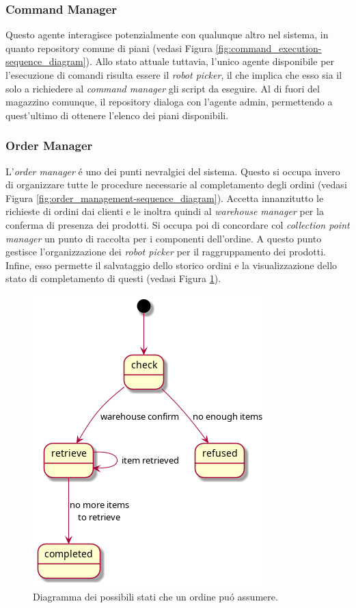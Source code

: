 \subsubsection{Command Manager}
Questo agente interagisce potenzialmente con qualunque altro nel sistema, in quanto repository comune di piani (vedasi Figura \ref{fig:command_execution-sequence_diagram}). Allo stato attuale tuttavia, l'unico agente disponibile per l'esecuzione di comandi risulta essere il \textit{robot picker}, il che implica che esso sia il solo a richiedere al \textit{command manager} gli script da eseguire. Al di fuori del magazzino comunque, il repository dialoga con l'agente admin, permettendo a quest'ultimo di ottenere l'elenco dei piani disponibili.

\subsubsection{Order Manager}
L'\textit{order manager} \'e uno dei punti nevralgici del sistema. Questo si occupa invero di organizzare tutte le procedure necessarie al completamento degli ordini (vedasi Figura \ref{fig:order_management-sequence_diagram}). Accetta innanzitutto le richieste di ordini dai clienti e le inoltra quindi al \textit{warehouse manager} per la conferma di presenza dei prodotti. Si occupa poi di concordare col \textit{collection point manager} un punto di raccolta per i componenti dell'ordine. A questo punto gestisce l'organizzazione dei \textit{robot picker} per il raggruppamento dei prodotti. Infine, esso permette il salvataggio dello storico ordini e la visualizzazione dello stato di completamento di questi (vedasi Figura \ref{fig:order-state_diagram}).
\begin{figure}[!ht]\centering
    \includegraphics[width=.75\textwidth]{section/design/figure/order-state_diagram.png}
    \caption{Diagramma dei possibili stati che un ordine pu\'o assumere.}%
    \label{fig:order-state_diagram}
\end{figure}

